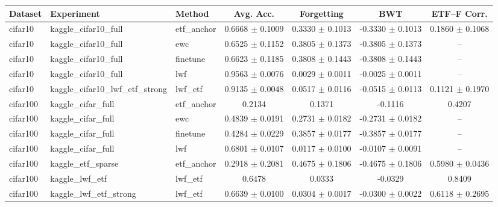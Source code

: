 \begin{tabular}{lllcccc}
\hline
Dataset & Experiment & Method & Avg. Acc. & Forgetting & BWT & ETF--F Corr. \\
\hline
cifar10 & kaggle_cifar10_full & etf_anchor & 0.6668 $\pm$ 0.1009 & 0.3330 $\pm$ 0.1013 & -0.3330 $\pm$ 0.1013 & 0.1860 $\pm$ 0.1068 \\
cifar10 & kaggle_cifar10_full & ewc & 0.6525 $\pm$ 0.1152 & 0.3805 $\pm$ 0.1373 & -0.3805 $\pm$ 0.1373 & -- \\
cifar10 & kaggle_cifar10_full & finetune & 0.6623 $\pm$ 0.1185 & 0.3808 $\pm$ 0.1443 & -0.3808 $\pm$ 0.1443 & -- \\
cifar10 & kaggle_cifar10_full & lwf & 0.9563 $\pm$ 0.0076 & 0.0029 $\pm$ 0.0011 & -0.0025 $\pm$ 0.0011 & -- \\
cifar10 & kaggle_cifar10_lwf_etf_strong & lwf_etf & 0.9135 $\pm$ 0.0048 & 0.0517 $\pm$ 0.0116 & -0.0515 $\pm$ 0.0113 & 0.1121 $\pm$ 0.1970 \\
cifar100 & kaggle_cifar_full & etf_anchor & 0.2134 & 0.1371 & -0.1116 & 0.4207 \\
cifar100 & kaggle_cifar_full & ewc & 0.4839 $\pm$ 0.0191 & 0.2731 $\pm$ 0.0182 & -0.2731 $\pm$ 0.0182 & -- \\
cifar100 & kaggle_cifar_full & finetune & 0.4284 $\pm$ 0.0229 & 0.3857 $\pm$ 0.0177 & -0.3857 $\pm$ 0.0177 & -- \\
cifar100 & kaggle_cifar_full & lwf & 0.6801 $\pm$ 0.0107 & 0.0117 $\pm$ 0.0100 & -0.0107 $\pm$ 0.0091 & -- \\
cifar100 & kaggle_etf_sparse & etf_anchor & 0.2918 $\pm$ 0.2081 & 0.4675 $\pm$ 0.1806 & -0.4675 $\pm$ 0.1806 & 0.5980 $\pm$ 0.0436 \\
cifar100 & kaggle_lwf_etf & lwf_etf & 0.6478 & 0.0333 & -0.0329 & 0.8409 \\
cifar100 & kaggle_lwf_etf_strong & lwf_etf & 0.6639 $\pm$ 0.0100 & 0.0304 $\pm$ 0.0017 & -0.0300 $\pm$ 0.0022 & 0.6118 $\pm$ 0.2695 \\
\hline
\end{tabular}
